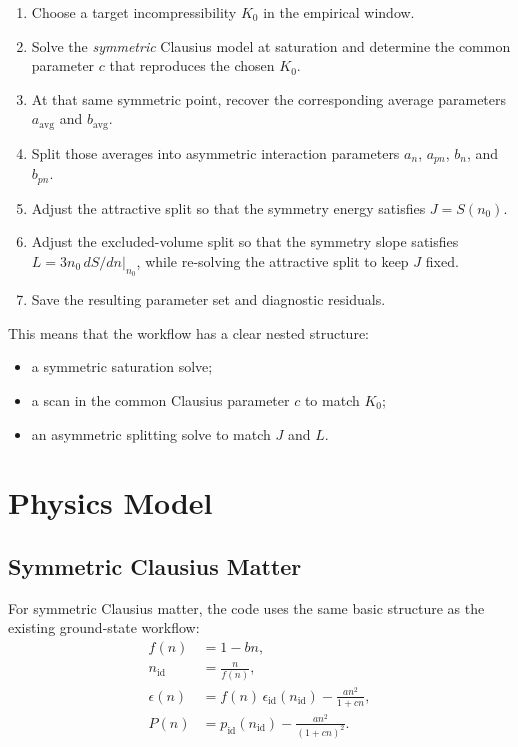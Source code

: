 \documentclass[11pt]{article}
\begin{document}
\begin{enumerate}
\item Choose a target incompressibility $K_0$ in the empirical window.
\item Solve the \emph{symmetric} Clausius model at saturation and determine the
common parameter $c$ that reproduces the chosen $K_0$.
\item At that same symmetric point, recover the corresponding average
parameters $a_{\mathrm{avg}}$ and $b_{\mathrm{avg}}$.
\item Split those averages into asymmetric interaction parameters
$a_n$, $a_{pn}$, $b_n$, and $b_{pn}$.
\item Adjust the attractive split so that the symmetry energy satisfies
$J = S(n_0)$.
\item Adjust the excluded-volume split so that the symmetry slope satisfies
$L = 3 n_0 \, dS/dn|_{n_0}$, while re-solving the attractive split to keep
$J$ fixed.
\item Save the resulting parameter set and diagnostic residuals.
\end{enumerate}

This means that the workflow has a clear nested structure:
\begin{itemize}
\item a symmetric saturation solve;
\item a scan in the common Clausius parameter $c$ to match $K_0$;
\item an asymmetric splitting solve to match $J$ and $L$.
\end{itemize}

\section{Physics Model}

\subsection{Symmetric Clausius Matter}

For symmetric Clausius matter, the code uses the same basic structure as the
existing ground-state workflow:
\begin{align}
f(n) &= 1 - b n, \\
n_{\mathrm{id}} &= \frac{n}{f(n)}, \\
\epsilon(n) &= f(n)\,\epsilon_{\mathrm{id}}(n_{\mathrm{id}})
- \frac{a n^2}{1 + c n}, \\
P(n) &= p_{\mathrm{id}}(n_{\mathrm{id}})
- \frac{a n^2}{(1 + c n)^2}.
\end{align}
\end{document}
